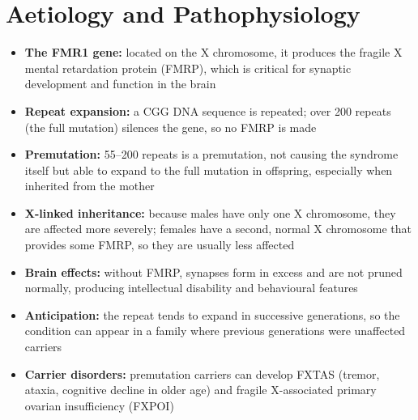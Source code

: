 \section*{Aetiology and Pathophysiology}
\begin{itemize}
    \item \textbf{The FMR1 gene:} located on the X chromosome, it produces the fragile X mental retardation protein (FMRP), which is critical for synaptic development and function in the brain
    \item \textbf{Repeat expansion:} a CGG DNA sequence is repeated; over 200 repeats (the full mutation) silences the gene, so no FMRP is made
    \item \textbf{Premutation:} 55--200 repeats is a premutation, not causing the syndrome itself but able to expand to the full mutation in offspring, especially when inherited from the mother
    \item \textbf{X-linked inheritance:} because males have only one X chromosome, they are affected more severely; females have a second, normal X chromosome that provides some FMRP, so they are usually less affected
    \item \textbf{Brain effects:} without FMRP, synapses form in excess and are not pruned normally, producing intellectual disability and behavioural features
    \item \textbf{Anticipation:} the repeat tends to expand in successive generations, so the condition can appear in a family where previous generations were unaffected carriers
    \item \textbf{Carrier disorders:} premutation carriers can develop FXTAS (tremor, ataxia, cognitive decline in older age) and fragile X-associated primary ovarian insufficiency (FXPOI)
\end{itemize}

